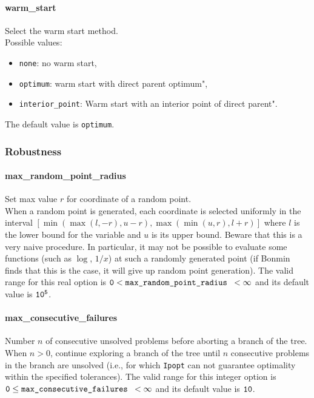 \paragraph{warm\_start}
Select the warm start method.\\ Possible values:
\begin{itemize}
\item {\tt none}: no warm start,
\item {\tt optimum}: warm start with direct parent optimum",
\item {\tt interior\_point}: Warm start with an interior point of direct parent".
\end{itemize}
The default value is {\tt optimum}.

\subsubsection{Robustness}

\paragraph{max\_random\_point\_radius}
Set max value $r$ for coordinate of a random point.\\
When a random point is generated, each coordinate is selected uniformly in the interval $[\min(\max(l,-r),u-r),\max(\min(u,r),l+r)]$ where $l$ is the lower bound
for the variable and $u$ is its upper bound.
Beware that this is a very naive procedure. In particular, it may not be possible to evaluate some functions (such as $\log$, $1/x$) at such a randomly generated point (if Bonmin finds that this is the case, it will give up random point generation).
The valid range for this real option is
${\tt 0} <  \hbox{\tt max\_random\_point\_radius } <  \infty$
and its default value is ${\tt 10^{5}}$.

\paragraph{max\_consecutive\_failures}
Number $n$ of consecutive unsolved problems before aborting a branch of the tree.\\
 When $n > 0$, continue exploring a branch of the
tree until $n$ consecutive problems in the branch
are unsolved (i.e., for
which {\tt Ipopt} can not guarantee optimality within
the specified tolerances). The valid range for this integer option is
${\tt 0} \le \hbox{\tt max\_consecutive\_failures } <  \infty$
and its default value is ${\tt 10}$.


